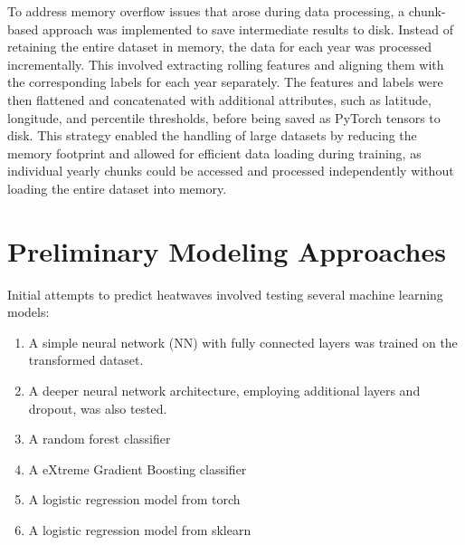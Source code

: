 \documentclass[conference,9pt]{IEEEtran}
\begin{document}
To address memory overflow issues that arose during data processing, a chunk-based approach was implemented to save intermediate results to disk. Instead of retaining the entire dataset in memory, the data for each year was processed incrementally. This involved extracting rolling features and aligning them with the corresponding labels for each year separately. The features and labels were then flattened and concatenated with additional attributes, such as latitude, longitude, and percentile thresholds, before being saved as PyTorch tensors to disk. This strategy enabled the handling of large datasets by reducing the memory footprint and allowed for efficient data loading during training, as individual yearly chunks could be accessed and processed independently without loading the entire dataset into memory.

\section{Preliminary Modeling Approaches}
Initial attempts to predict heatwaves involved testing several machine learning models:
\begin{enumerate}[1.]
    \item A simple neural network (NN) with fully connected layers was trained on the transformed dataset.
    \item A deeper neural network architecture, employing additional layers and dropout, was also tested.
    \item A random forest classifier
    \item A eXtreme Gradient Boosting classifier
    \item A logistic regression model from torch
    \item A logistic regression model from sklearn
\end{enumerate}
\end{document}
